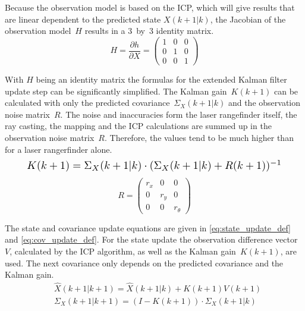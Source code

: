 Because the observation model is based on the ICP, which will give results that are linear dependent to the predicted state \mbox{$X(k+1|k)$}, the Jacobian of the observation \mbox{model $H$} results in a \mbox{3 by 3} identity matrix.
\begin{equation}
H = \frac{\partial h}{\partial X} =\begin{pmatrix} 1 & 0 & 0 \\ 0 & 1 & 0 \\ 0 & 0 & 1\end{pmatrix} \label{eq:H_def}
\end{equation}

With $H$ being an identity matrix the formulas for the extended Kalman filter update step can be significantly simplified. The Kalman \mbox{gain $K(k+1)$} can be calculated with only the predicted \mbox{covariance $\Sigma_{X}(k+1|k)$} and the observation noise \mbox{matrix $R$}. The noise and inaccuracies form the laser rangefinder itself, the ray casting, the mapping and the ICP calculations are summed up in the observation noise \mbox{matrix $R$}. Therefore, the values tend to be much higher than for a laser rangerfinder alone.
\begin{equation}\label{eq:Kalman_def}
    \resizebox{0.89\hsize}{!}{%
        $K(k+1)= \Sigma_{X}(k+1|k)\cdot {(\Sigma_{X}(k+1|k) + R(k+1)})^{-1} $%
        }
\end{equation}
\begin{equation}
R= \begin{pmatrix} r_{x} & 0 & 0 \\ 0 & r_{y} & 0 \\ 0 & 0 & r_{\theta}\end{pmatrix}\label{R_def}
\end{equation}

The state and covariance update equations are given in \eqref{eq:state_update_def} and \eqref{eq:cov_update_def}. For the state update the observation difference \mbox{vector $V$,} calculated by the ICP algorithm, as well as the Kalman \mbox{gain $K(k+1)$,} are used. The next covariance only depends on the predicted covariance and the Kalman gain.
\begin{align}
& \hat{X}(k+1|k+1) = \hat{X}(k+1|k) + K(k+1)V(k+1) \label{eq:state_update_def} \\
& \Sigma_{X}(k+1|k+1) = (I-K(k+1))\cdot\Sigma_{X}(k+1|k) \label{eq:cov_update_def}
\end{align}



